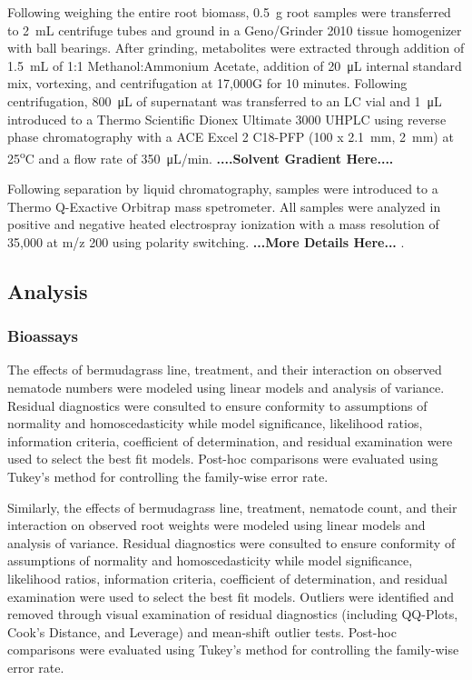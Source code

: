 \documentclass[9pt,lineno]{elife}
\begin{document}
Following weighing the entire root biomass, \SI{0.5}{\gram} root samples were transferred to \SI{2}{\milli\liter} centrifuge tubes and ground in a Geno/Grinder 2010 tissue homogenizer with ball bearings.  After grinding, metabolites were extracted through addition of \SI{1.5}{\milli\liter} of 1:1 Methanol:Ammonium Acetate, addition of \SI{20}{\micro\liter} internal standard mix, vortexing, and centrifugation at 17,000G for 10 minutes.  Following centrifugation, \SI{800}{\micro\liter} of supernatant was transferred to an LC vial and \SI{1}{\micro\liter} introduced to a Thermo Scientific Dionex Ultimate 3000 UHPLC using reverse phase chromatography with a ACE Excel 2 C18-PFP (100 x \SI{2.1}{\milli\meter}, \SI{2}{\milli\meter}) at 25\textsuperscript{o}C and a flow rate of \SI{350}{\micro\liter}/min.  \textbf{....Solvent Gradient Here....} 

Following separation by liquid chromatography, samples were introduced to a Thermo Q-Exactive Orbitrap mass spetrometer.  All samples were analyzed in positive and negative heated electrospray ionization with a mass resolution of 35,000 at m/z 200 using polarity switching. \textbf{...More Details Here...} .  


\subsection{Analysis}

\subsubsection{Bioassays}

The effects of bermudagrass line, treatment, and their interaction on observed nematode numbers were modeled using linear models and analysis of variance.  Residual diagnostics were consulted to ensure conformity to assumptions of normality and homoscedasticity while model significance, likelihood ratios, information criteria, coefficient of determination, and residual examination were used to select the best fit models.  Post-hoc comparisons were evaluated using Tukey's method for controlling the family-wise error rate. 

Similarly, the effects of bermudagrass line, treatment, nematode count, and their interaction on observed root weights were modeled using linear models and analysis of variance. Residual diagnostics were consulted to ensure conformity of assumptions of normality and homoscedasticity while model significance, likelihood ratios, information criteria, coefficient of determination, and residual examination were used to select the best fit models.  Outliers were identified and removed through visual examination of residual diagnostics (including QQ-Plots, Cook's Distance, and Leverage) and mean-shift outlier tests.  Post-hoc comparisons were evaluated using Tukey's method for controlling the family-wise error rate.
\end{document}
